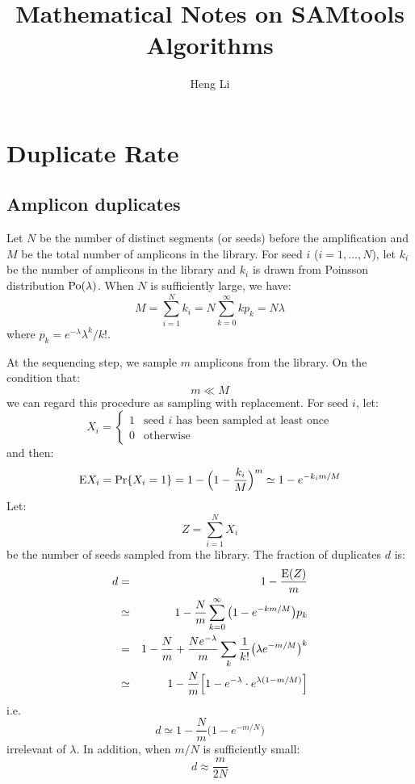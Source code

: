 \documentclass[pdftex,10pt]{book}
\title{Mathematical Notes on SAMtools Algorithms}
\author{Heng Li}
\begin{document}
\maketitle

\chapter{Duplicate Rate}

\section{Amplicon duplicates}

Let $N$ be the number of distinct segments (or seeds) before the
amplification and $M$ be the total number of amplicons in the
library. For seed $i$ ($i=1,\ldots,N$), let $k_i$ be the number of
amplicons in the library and $k_i$ is drawn from Poinsson distribution
${\rm Po}(\lambda)$. When $N$ is sufficiently large, we have:
\[
M=\sum_{i=1}^Nk_i=N\sum_{k=0}^{\infty}kp_k=N\lambda
\]
where $p_k=e^{-\lambda}\lambda^k/{k!}$.

At the sequencing step, we sample $m$ amplicons from the library. On the
condition that:
\begin{equation}
  m\ll M
\end{equation}
we can regard this procedure as sampling with replacement. For seed $i$,
let:
\begin{equation*}
  X_i=\left\{\begin{array}{ll}
      1 & \mbox{seed $i$ has been sampled at least once} \\
      0 & \mbox{otherwise}
    \end{array}
  \right.
\end{equation*}
and then:
\begin{equation*}
  {\rm E} X_i= \Pr\{X_i=1\}=1-\Big(1-\frac{k_i}{M}\Big)^m\simeq 1-e^{-k_i m/M}
\end{equation*}
Let:
\[Z=\sum_{i=1}^NX_i\]
be the number of seeds sampled from the
library. The fraction of duplicates $d$ is:
\begin{eqnarray*}
  d&=&1-\frac{{\rm E}(Z)}{m}\\
  &\simeq&1-\frac{N}{m}\sum_{k=0}^{\infty}\big(1-e^{-km/M}\big)p_k\\
  &=&1-\frac{N}{m}+\frac{N e^{-\lambda}}{m}\sum_k \frac{1}{k!}\big(\lambda e^{-m/M}\big)^k\\
  &\simeq& 1-\frac{N}{m}\Big[1-e^{-\lambda}\cdot e^{\lambda(1-m/M)}\Big]
\end{eqnarray*}
i.e.
\begin{equation}
  d \simeq 1 - \frac{N}{m}\Big(1-e^{-m/N}\Big)
\end{equation}
irrelevant of $\lambda$. In addition, when $m/N$ is sufficiently small:
\begin{equation}\label{equ:d2}
  d\approx \frac{m}{2N}
\end{equation}
\end{document}
